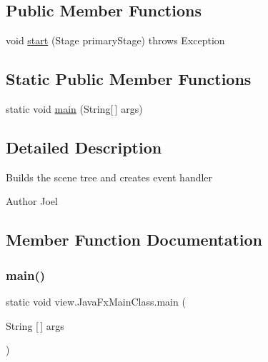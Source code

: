 \subsection*{Public Member Functions}
\begin{DoxyCompactItemize}
\item 
void \mbox{\hyperlink{classview_1_1_java_fx_main_class_a49da0dd068016aa12c36e77dee3f324e}{start}} (Stage primary\+Stage)  throws Exception 
\end{DoxyCompactItemize}
\subsection*{Static Public Member Functions}
\begin{DoxyCompactItemize}
\item 
static void \mbox{\hyperlink{classview_1_1_java_fx_main_class_a98afcc89a8d1e644f9c9f7a9297823c4}{main}} (String\mbox{[}$\,$\mbox{]} args)
\end{DoxyCompactItemize}


\subsection{Detailed Description}
Builds the scene tree and creates event handler \begin{DoxyAuthor}{Author}
Joel 
\end{DoxyAuthor}


\subsection{Member Function Documentation}
\mbox{\label{classview_1_1_java_fx_main_class_a98afcc89a8d1e644f9c9f7a9297823c4}} 
\subsubsection{\texorpdfstring{main()}{main()}}
{\footnotesize\ttfamily static void view.\+Java\+Fx\+Main\+Class.\+main (\begin{DoxyParamCaption}\item[{String \mbox{[}$\,$\mbox{]}}]{args }\end{DoxyParamCaption})\hspace{0.3cm}{\ttfamily [static]}}

